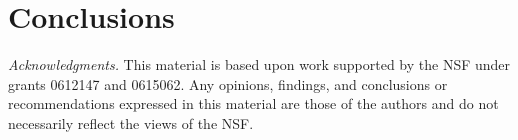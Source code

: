 \documentclass[letterpaper,twocolumn,10pt]{article}
\begin{document}
%

%

%

\section{Conclusions}
\label{sec:conclusions}


{\em Acknowledgments.}
This material is based upon work 
supported by the NSF under grants 0612147 and 0615062.
Any opinions, findings, and conclusions or recommendations expressed in 
this material are those of the authors and do not necessarily reflect 
the views of the NSF.



\end{document}
